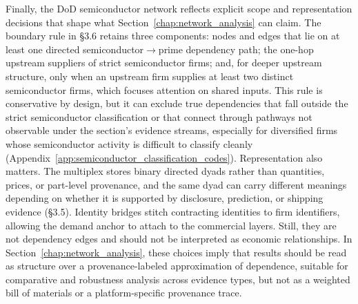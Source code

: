 Finally, the DoD semiconductor network reflects explicit scope and representation decisions that shape what Section~\ref{chap:network_analysis} can claim. The boundary rule in \S3.6 retains three components: nodes and edges that lie on at least one directed semiconductor$\rightarrow$prime dependency path; the one-hop upstream suppliers of strict semiconductor firms; and, for deeper upstream structure, only when an upstream firm supplies at least two distinct semiconductor firms, which focuses attention on shared inputs. This rule is conservative by design, but it can exclude true dependencies that fall outside the strict semiconductor classification or that connect through pathways not observable under the section's evidence streams, especially for diversified firms whose semiconductor activity is difficult to classify cleanly (Appendix~\ref{app:semiconductor_classification_codes}). Representation also matters. The multiplex stores binary directed dyads rather than quantities, prices, or part-level provenance, and the same dyad can carry different meanings depending on whether it is supported by disclosure, prediction, or shipping evidence (\S3.5). Identity bridges stitch contracting identities to firm identifiers, allowing the demand anchor to attach to the commercial layers. Still, they are not dependency edges and should not be interpreted as economic relationships. In Section~\ref{chap:network_analysis}, these choices imply that results should be read as structure over a provenance-labeled approximation of dependence, suitable for comparative and robustness analysis across evidence types, but not as a weighted bill of materials or a platform-specific provenance trace.

